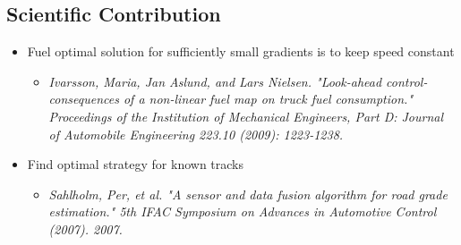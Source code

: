\documentclass[paper=a4, fontsize=11pt]{scrartcl} %
\numberwithin{equation}{section} %
\numberwithin{figure}{section} %
\numberwithin{table}{section} %
\begin{document}
\subsection{Scientific Contribution}
\begin{itemize}
	\item Fuel optimal solution for sufficiently small gradients is to keep speed constant
	\begin{itemize}
		\item \textit{Ivarsson, Maria, Jan Aslund, and Lars Nielsen. "Look-ahead control-consequences of a non-linear fuel map on truck fuel consumption." Proceedings of the Institution of Mechanical Engineers, Part D: Journal of Automobile Engineering 223.10 (2009): 1223-1238.}
	\end{itemize}
	\item Find optimal strategy for known tracks
	\begin{itemize}
		\item \textit{Sahlholm, Per, et al. "A sensor and data fusion algorithm for road grade estimation." 5th IFAC Symposium on Advances in Automotive Control (2007). 2007.}
	\end{itemize}
	
\end{itemize}
\end{document}
